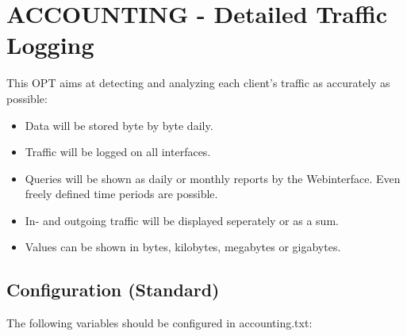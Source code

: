 {
\section {ACCOUNTING - Detailed Traffic Logging}
}

This OPT aims at detecting and analyzing each client's traffic as accurately as possible:
\begin{itemize}
\item Data will be stored byte by byte daily.
\item Traffic will be logged on all interfaces.
\item Queries will be shown as daily or monthly reports by the Webinterface. 
Even freely defined time periods are possible.
\item In- and outgoing traffic will be displayed seperately or as a sum.
\item Values can be shown in bytes, kilobytes, megabytes or gigabytes.
\end{itemize}

\subsection{Configuration (Standard)}
The following variables should be configured in accounting.txt:

